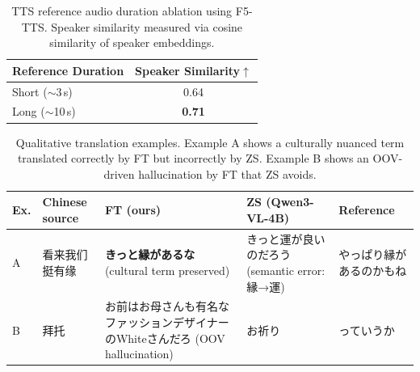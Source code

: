 \documentclass[11pt]{article}
\begin{document}
\begin{table}[t]
\centering
\caption{TTS reference audio duration ablation using F5-TTS. Speaker similarity measured via cosine similarity of speaker embeddings.}
\label{tab:ablation_tts}
\begin{tabular}{lc}
\toprule
\textbf{Reference Duration} & \textbf{Speaker Similarity}$\uparrow$ \\
\midrule
Short ($\sim$3\,s) & 0.64 \\
Long ($\sim$10\,s) & \textbf{0.71} \\
\bottomrule
\end{tabular}
\end{table}

\begin{table}[t]
\centering
\caption{Qualitative translation examples. Example A shows a culturally nuanced term translated correctly by FT but incorrectly by ZS. Example B shows an OOV-driven hallucination by FT that ZS avoids.}
\label{tab:qual_examples}
\begin{tabular}{llp{3.6cm}p{3.6cm}p{3.2cm}}
\toprule
\textbf{Ex.} & \textbf{Chinese source} & \textbf{FT (ours)} & \textbf{ZS (Qwen3-VL-4B)} & \textbf{Reference} \\
\midrule
A & 看来我们挺有缘 & \textbf{きっと縁があるな} \newline (cultural term preserved) & きっと運が良いのだろう \newline (semantic error: 縁→運) & やっぱり縁があるのかもね \\
\midrule
B & 拜托 & お前はお母さんも有名なファッションデザイナーのWhiteさんだろ \newline (OOV hallucination) & お祈り & っていうか \\
\bottomrule
\end{tabular}
\end{table}
\end{document}
